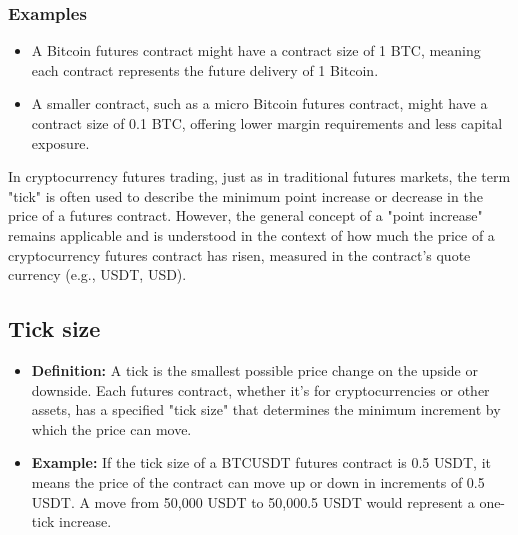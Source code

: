 \documentclass{report}
\begin{document}
    \subsubsection{Examples}
    \bigbreak \noindent 
    \begin{itemize}
        \item A Bitcoin futures contract might have a contract size of 1 BTC, meaning each contract represents the future delivery of 1 Bitcoin.
        \item A smaller contract, such as a micro Bitcoin futures contract, might have a contract size of 0.1 BTC, offering lower margin requirements and less capital exposure.
    \end{itemize}

    \pagebreak 
    \bigbreak \noindent 
    In cryptocurrency futures trading, just as in traditional futures markets, the term "tick" is often used to describe the minimum point increase or decrease in the price of a futures contract. However, the general concept of a "point increase" remains applicable and is understood in the context of how much the price of a cryptocurrency futures contract has risen, measured in the contract's quote currency (e.g., USDT, USD).
    \bigbreak \noindent 
    \subsection{Tick size}
    \begin{itemize}
        \item \textbf{Definition:} A tick is the smallest possible price change on the upside or downside. Each futures contract, whether it's for cryptocurrencies or other assets, has a specified "tick size" that determines the minimum increment by which the price can move.
        \item \textbf{Example:} If the tick size of a BTCUSDT futures contract is 0.5 USDT, it means the price of the contract can move up or down in increments of 0.5 USDT. A move from 50,000 USDT to 50,000.5 USDT would represent a one-tick increase.
    \end{itemize}
    \bigbreak \noindent 
\end{document}
